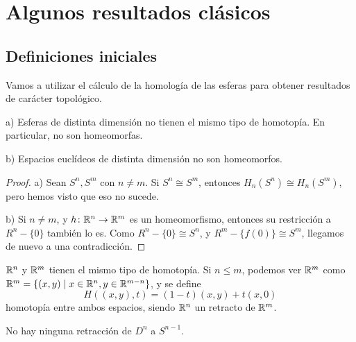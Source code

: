 \chapter{Algunos resultados clásicos}\label{ch:resultados}

\section{Definiciones iniciales}

Vamos a utilizar el cálculo de la homología de las esferas para obtener resultados
de carácter topológico.

\begin{proposition}
  a) Esferas de distinta dimensión no tienen el mismo tipo de homotopía. En particular, no son homeomorfas.

  b) Espacios euclídeos de distinta dimensión no son homeomorfos.
\end{proposition}

\begin{proof}
  a) Sean $S^n, S^m$ con $n \neq m$. Si $S^n \cong S^m$, entonces $H_n(S^n) \cong H_n(S^m)$, pero hemos visto que eso no sucede.

  b) Si $n \neq m$, y $h \colon \mathbb{R}^n \to \mathbb{R}^m$ es un homeomorfismo, entonces su restricción a $R^n - \{0\}$ también lo es.
  Como $R^n - \{0\} \cong S^n$, y $R^m - \{f(0)\} \cong S^m$, llegamos de nuevo a una contradicción.
\end{proof}

\begin{remark}
  $\mathbb{R}^n$ y $\mathbb{R}^m$ tienen el mismo tipo de homotopía. Si $n \leq m$, podemos ver $\mathbb{R}^m$ como \\
  $\mathbb{R}^m = \{(x, y) \mid x \in \mathbb{R}^n, y \in \mathbb{R}^{m-n}\}$, y se define
  \[ H((x, y), t) = (1-t)(x, y) + t(x, 0) \]
  homotopía entre ambos espacios, siendo $\mathbb{R}^n$ un retracto de $\mathbb{R}^m$.
\end{remark}

\begin{lemma}
  No hay ninguna retracción de $D^n$ a $S^{n-1}$.
\end{lemma}

